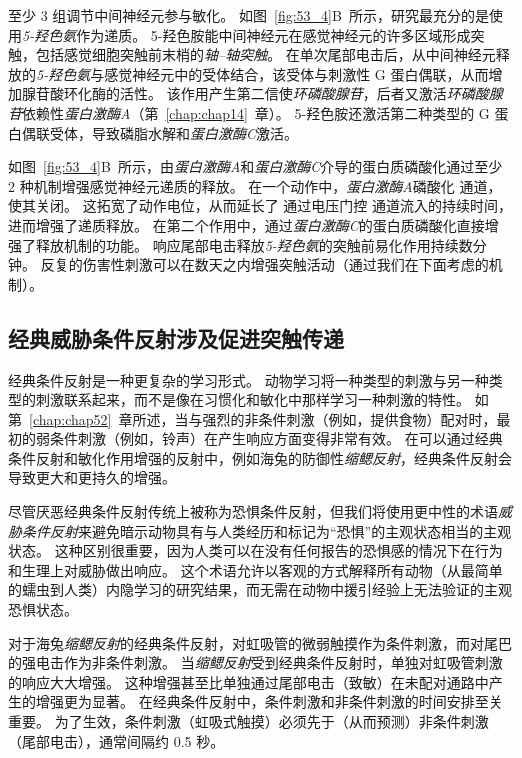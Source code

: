 至少 3 组调节中间神经元参与敏化。
如图~\ref{fig:53_4}B~所示，研究最充分的是使用\textit{5-羟色氨}作为递质。
5-羟色胺能中间神经元在感觉神经元的许多区域形成突触，包括感觉细胞突触前末梢的\textit{轴–轴突触}。
在单次尾部电击后，从中间神经元释放的\textit{5-羟色氨}与感觉神经元中的受体结合，该受体与刺激性 G 蛋白偶联，从而增加腺苷酸环化酶的活性。
该作用产生第二信使\textit{环磷酸腺苷}，后者又激活\textit{环磷酸腺苷}依赖性\textit{蛋白激酶A}（第~\ref{chap:chap14}~章）。
5-羟色胺还激活第二种类型的 G 蛋白偶联受体，导致磷脂水解和\textit{蛋白激酶C}激活。


如图~\ref{fig:53_4}B~所示，由\textit{蛋白激酶A}和\textit{蛋白激酶C}介导的蛋白质磷酸化通过至少 2 种机制增强感觉神经元递质的释放。
在一个动作中，\textit{蛋白激酶A}磷酸化  通道，使其关闭。 这拓宽了动作电位，从而延长了  通过电压门控  通道流入的持续时间，进而增强了递质释放。
在第二个作用中，通过\textit{蛋白激酶C}的蛋白质磷酸化直接增强了释放机制的功能。
响应尾部电击释放\textit{5-羟色氨}的突触前易化作用持续数分钟。
反复的伤害性刺激可以在数天之内增强突触活动（通过我们在下面考虑的机制）。



\subsection{经典威胁条件反射涉及促进突触传递}

经典条件反射是一种更复杂的学习形式。
动物学习将一种类型的刺激与另一种类型的刺激联系起来，而不是像在习惯化和敏化中那样学习一种刺激的特性。
如第~\ref{chap:chap52}~章所述，当与强烈的非条件刺激（例如，提供食物）配对时，最初的弱条件刺激（例如，铃声）在产生响应方面变得非常有效。
在可以通过经典条件反射和敏化作用增强的反射中，例如海兔的防御性\textit{缩鳃反射}，经典条件反射会导致更大和更持久的增强。


尽管厌恶经典条件反射传统上被称为恐惧条件反射，但我们将使用更中性的术语\textit{威胁条件反射}来避免暗示动物具有与人类经历和标记为“恐惧”的主观状态相当的主观状态。
这种区别很重要，因为人类可以在没有任何报告的恐惧感的情况下在行为和生理上对威胁做出响应。
这个术语允许以客观的方式解释所有动物（从最简单的蠕虫到人类）内隐学习的研究结果，而无需在动物中援引经验上无法验证的主观恐惧状态。


对于海兔\textit{缩鳃反射}的经典条件反射，对虹吸管的微弱触摸作为条件刺激，而对尾巴的强电击作为非条件刺激。
当\textit{缩鳃反射}受到经典条件反射时，单独对虹吸管刺激的响应大大增强。
这种增强甚至比单独通过尾部电击（致敏）在未配对通路中产生的增强更为显著。 
在经典条件反射中，条件刺激和非条件刺激的时间安排至关重要。
为了生效，条件刺激（虹吸式触摸）必须先于（从而预测）非条件刺激（尾部电击），通常间隔约 0.5 秒。


